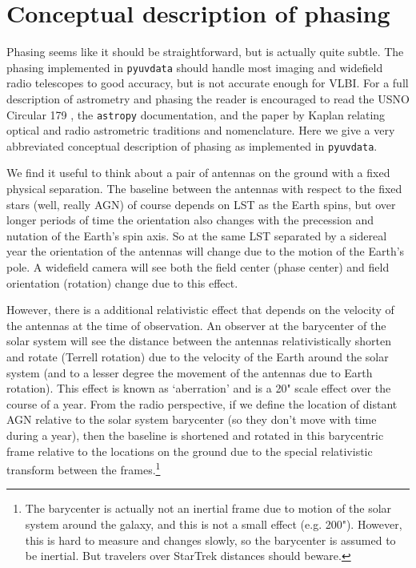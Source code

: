 \documentclass[11pt, oneside]{article}   	%
\begin{document}
\section{Conceptual description of phasing}

Phasing seems like it should be straightforward, but is actually quite subtle. The phasing implemented in \texttt{pyuvdata} should handle most imaging and widefield radio telescopes to good accuracy, but is not accurate enough for VLBI. For a full description of astrometry and phasing the reader is encouraged to read the USNO Circular 179 \cite{USNO}, the \texttt{astropy} documentation, and the paper by {Kaplan} relating optical and radio astrometric traditions and nomenclature. Here we give a very abbreviated conceptual description of phasing as implemented in \texttt{pyuvdata}.

We find it useful to think about a pair of antennas on the ground with a fixed physical separation. The baseline between the antennas with respect to the fixed stars (well, really AGN) of course depends on LST as the Earth spins, but over longer periods of time the orientation also changes with the precession and nutation of the Earth's spin axis. So at the same LST separated by a sidereal year the orientation of the antennas will change due to the motion of the Earth's pole. A widefield camera will see both the field center (phase center) and field orientation (rotation) change due to this effect.

However, there is a additional relativistic effect that depends on the velocity of the antennas at the time of observation. An observer at the barycenter of the solar system will see the distance between the antennas relativistically shorten and rotate (Terrell rotation) due to the velocity of the Earth around the solar system (and to a lesser degree the movement of the antennas due to Earth rotation). This effect is known as `aberration' and is a 20" scale effect over the course of a year. From the radio perspective, if we define the location of distant AGN relative to the solar system barycenter (so they don't move with time during a year), then the baseline is shortened and rotated in this barycentric frame relative to the locations on the ground due to the special relativistic transform between the frames.\footnote{The barycenter is actually not an inertial frame due to motion of the solar system around the galaxy, and this is not a small effect (e.g. 200"). However, this is hard to measure and changes slowly, so the barycenter is assumed to be inertial. But travelers over StarTrek distances should beware.} 
\end{document}
